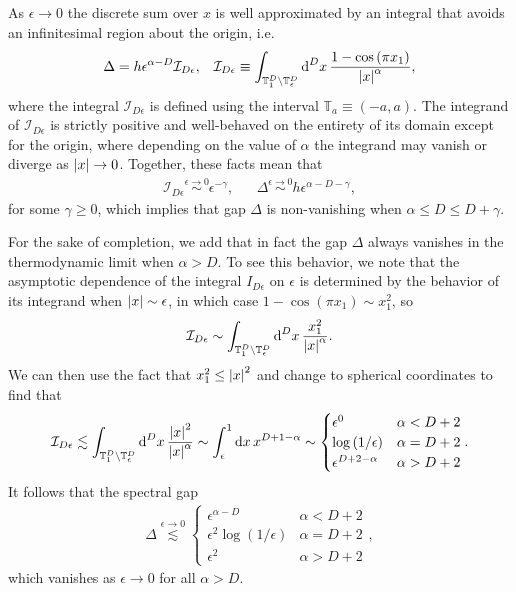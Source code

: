 \documentclass[nofootinbib,notitlepage,11pt]{revtex4-2}
\newcommand{\f}[2]{\dfrac{#1}{#2}} %
\newcommand{\p}[1]{\left(#1\right)} %
\newcommand{\1}{\mathds{1}}
\renewcommand{\d}{\text{d}}
\newcommand{\I}{\mathcal{I}}
\newcommand{\TT}{\mathbb{T}}
\begin{document}
As $\epsilon\to0$ the discrete sum over $x$ is well approximated by an
integral that avoids an infinitesimal region about the origin, i.e.
\begin{align}
  \Delta = h \epsilon^{\alpha-D} \I_{D\epsilon},
  &&
  \I_{D\epsilon}
  \equiv \int_{\TT_1^D\setminus\TT_\epsilon^D} \d^Dx\,
  \f{1-\cos\p{\pi x_1}}{\abs{x}^\alpha},
\end{align}
where the integral $\I_{D\epsilon}$ is defined using the interval
$\TT_a\equiv\p{-a,a}$.  The integrand of $\I_{D\epsilon}$ is strictly
positive and well-behaved on the entirety of its domain except for the
origin, where depending on the value of $\alpha$ the integrand may
vanish or diverge as $\abs{x}\to0$.  Together, these facts mean that
\begin{align}
  \I_{D\epsilon} \stackrel{\epsilon\to0}{\sim} \epsilon^{-\gamma},
  &&
  \Delta \stackrel{\epsilon\to0}{\sim} h \epsilon^{\alpha-D-\gamma},
\end{align}
for some $\gamma\ge0$, which implies that gap $\Delta$ is
non-vanishing when $\alpha\le D\le D+\gamma$.

For the sake of completion, we add that in fact the gap $\Delta$
always vanishes in the thermodynamic limit when $\alpha>D$.  To see
this behavior, we note that the asymptotic dependence of the integral
$I_{D\epsilon}$ on $\epsilon$ is determined by the behavior of its
integrand when $\abs{x}\sim\epsilon$, in which case
$1-\cos\p{\pi x_1}\sim x_1^2$, so
\begin{align}
  \I_{D\epsilon}
  \sim \int_{\TT_1^D\setminus\TT_\epsilon^D} \d^Dx\,
  \f{x_1^2}{\abs{x}^\alpha}.
\end{align}
We can then use the fact that $x_1^2\le\abs{x}^2$ and change to
spherical coordinates to find that
\begin{align}
  \I_{D\epsilon} \lesssim
  \int_{\TT_1^D\setminus\TT_\epsilon^D} \d^Dx\,
  \f{\abs{x}^2}{\abs{x}^\alpha}
  \sim \int_\epsilon^1 \d x\, x^{D+1-\alpha}
  \sim
  \begin{cases}
    \epsilon^0 & \alpha < D+2 \\
    \log\p{1/\epsilon} & \alpha = D+2 \\
    \epsilon^{D+2-\alpha} & \alpha > D+2
  \end{cases}.
\end{align}
It follows that the spectral gap
\begin{align}
  \Delta \stackrel{\epsilon\to0}{\lesssim}
  \begin{cases}
    \epsilon^{\alpha-D} & \alpha < D+2 \\
    \epsilon^2 \log\p{1/\epsilon} & \alpha = D + 2 \\
    \epsilon^2 & \alpha > D+2
  \end{cases},
\end{align}
which vanishes as $\epsilon\to0$ for all $\alpha>D$.
\end{document}
